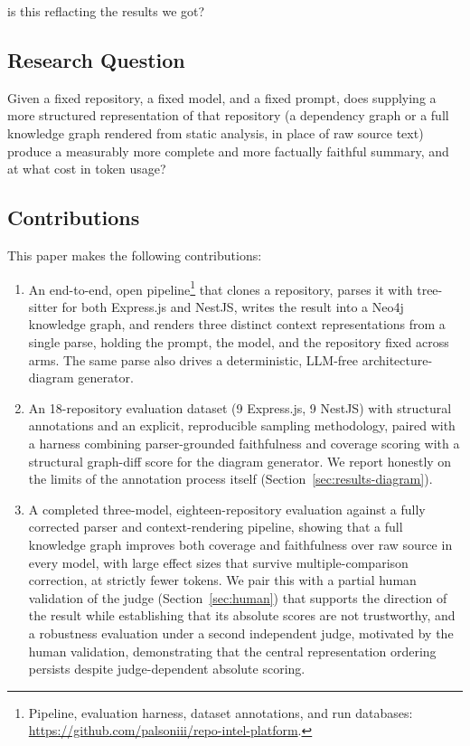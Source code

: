 is this reflacting the results we got?\documentclass[conference]{IEEEtran}
\begin{document}
\subsection{Research Question}
Given a fixed repository, a fixed model, and a fixed prompt, does supplying a more structured
representation of that repository (a dependency graph or a full knowledge graph rendered from
static analysis, in place of raw source text) produce a measurably more complete and more
factually faithful summary, and at what cost in token usage?

\subsection{Contributions}
This paper makes the following contributions:

\begin{enumerate}
\item An end-to-end, open pipeline\footnote{Pipeline, evaluation harness, dataset annotations,
and run databases: \url{https://github.com/palsoniii/repo-intel-platform}.} that clones a
repository, parses it with tree-sitter for both Express.js and NestJS, writes the result into a
Neo4j knowledge graph, and renders three distinct context representations from a single parse,
holding the prompt, the model, and the repository fixed across arms. The same parse also drives
a deterministic, LLM-free architecture-diagram generator.
\item An 18-repository evaluation dataset (9 Express.js, 9 NestJS) with structural annotations
and an explicit, reproducible sampling methodology, paired with a harness combining
parser-grounded faithfulness and coverage scoring with a structural graph-diff score for the
diagram generator. We report honestly on the limits of the annotation process itself
(Section~\ref{sec:results-diagram}).
\item A completed three-model, eighteen-repository evaluation against a fully corrected parser
and context-rendering pipeline, showing that a full knowledge graph improves both coverage and
faithfulness over raw source in every model, with large effect sizes that survive
multiple-comparison correction, at strictly fewer tokens. We pair this with a partial human
validation of the judge (Section~\ref{sec:human}) that supports the direction of the result
while establishing that its absolute scores are not trustworthy, and a robustness evaluation under a second independent judge, motivated by the human validation, demonstrating that the central representation ordering persists despite judge-dependent absolute scoring.
\end{enumerate}
\end{document}
